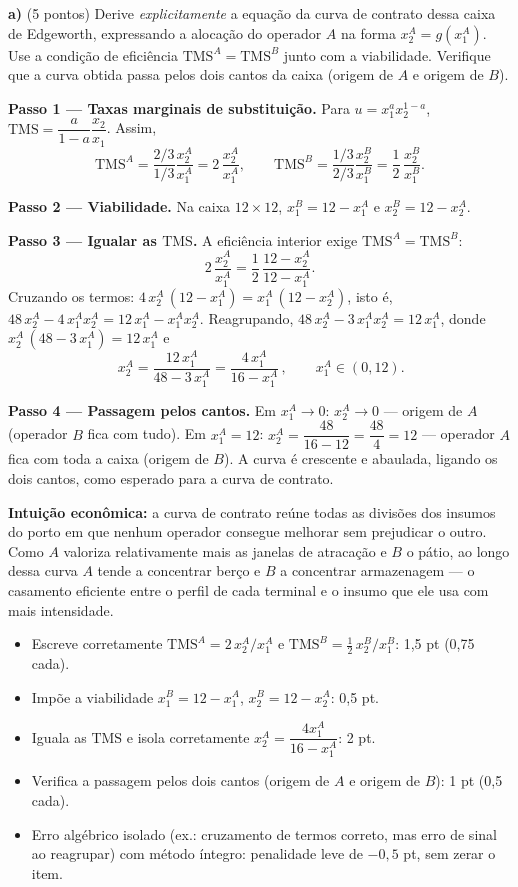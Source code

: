 \textbf{a)} (5 pontos) Derive \emph{explicitamente} a equação da curva de contrato dessa caixa de Edgeworth, expressando a alocação do operador $A$ na forma $x_2^A = g(x_1^A)$. Use a condição de eficiência $\text{TMS}^A = \text{TMS}^B$ junto com a viabilidade. Verifique que a curva obtida passa pelos dois cantos da caixa (origem de $A$ e origem de $B$).
\resolucaobox{5.5cm}
\begin{solucao}
\textbf{Passo 1 --- Taxas marginais de substituição.} Para $u=x_1^{a}x_2^{1-a}$, $\text{TMS}=\dfrac{a}{1-a}\dfrac{x_2}{x_1}$. Assim,
\[ \text{TMS}^A = \frac{2/3}{1/3}\frac{x_2^A}{x_1^A} = 2\,\frac{x_2^A}{x_1^A}, \qquad \text{TMS}^B = \frac{1/3}{2/3}\frac{x_2^B}{x_1^B} = \frac{1}{2}\,\frac{x_2^B}{x_1^B}. \]

\textbf{Passo 2 --- Viabilidade.} Na caixa $12\times 12$, $x_1^B = 12 - x_1^A$ e $x_2^B = 12 - x_2^A$.

\textbf{Passo 3 --- Igualar as $\text{TMS}$.} A eficiência interior exige $\text{TMS}^A=\text{TMS}^B$:
\[ 2\,\frac{x_2^A}{x_1^A} = \frac{1}{2}\,\frac{12 - x_2^A}{12 - x_1^A}. \]
Cruzando os termos: $4\,x_2^A\,(12 - x_1^A) = x_1^A\,(12 - x_2^A)$, isto é, $48\,x_2^A - 4\,x_1^A x_2^A = 12\,x_1^A - x_1^A x_2^A$. Reagrupando, $48\,x_2^A - 3\,x_1^A x_2^A = 12\,x_1^A$, donde $x_2^A\,(48 - 3\,x_1^A) = 12\,x_1^A$ e
\[ \boxed{\,x_2^A = \frac{12\,x_1^A}{48 - 3\,x_1^A} = \frac{4\,x_1^A}{16 - x_1^A}\,}, \qquad x_1^A\in(0,12). \]

\textbf{Passo 4 --- Passagem pelos cantos.} Em $x_1^A\to 0$: $x_2^A\to 0$ --- origem de $A$ (operador $B$ fica com tudo). Em $x_1^A = 12$: $x_2^A = \dfrac{48}{16-12} = \dfrac{48}{4} = 12$ --- operador $A$ fica com toda a caixa (origem de $B$). A curva é crescente e abaulada, ligando os dois cantos, como esperado para a curva de contrato.

\textbf{Intuição econômica:} a curva de contrato reúne todas as divisões dos insumos do porto em que nenhum operador consegue melhorar sem prejudicar o outro. Como $A$ valoriza relativamente mais as janelas de atracação e $B$ o pátio, ao longo dessa curva $A$ tende a concentrar berço e $B$ a concentrar armazenagem --- o casamento eficiente entre o perfil de cada terminal e o insumo que ele usa com mais intensidade.
\rubricalabel
\begin{itemize}
\item Escreve corretamente $\text{TMS}^A = 2\,x_2^A/x_1^A$ e $\text{TMS}^B = \tfrac12\,x_2^B/x_1^B$: 1{,}5 pt (0{,}75 cada).
\item Impõe a viabilidade $x_1^B = 12 - x_1^A$, $x_2^B = 12 - x_2^A$: 0{,}5 pt.
\item Iguala as $\text{TMS}$ e isola corretamente $x_2^A = \dfrac{4 x_1^A}{16 - x_1^A}$: 2 pt.
\item Verifica a passagem pelos dois cantos (origem de $A$ e origem de $B$): 1 pt (0{,}5 cada).
\item Erro algébrico isolado (ex.: cruzamento de termos correto, mas erro de sinal ao reagrupar) com método íntegro: penalidade leve de $-0{,}5$ pt, sem zerar o item.
\end{itemize}
\end{solucao}

